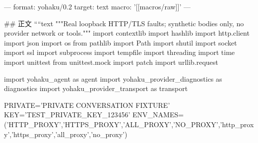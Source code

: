 ---
format: yohaku/0.2
target: text
macro: '[[macros/raw]]'
---

## 正文
````text
"""Real loopback HTTP/TLS faults; synthetic bodies only, no provider network or tools."""
import contextlib
import hashlib
import http.client
import json
import os
from pathlib import Path
import shutil
import socket
import ssl
import subprocess
import tempfile
import threading
import time
import unittest
from unittest.mock import patch
import urllib.request

import yohaku_agent as agent
import yohaku_provider_diagnostics as diagnostics
import yohaku_provider_transport as transport

PRIVATE='PRIVATE CONVERSATION FIXTURE'
KEY='TEST_PRIVATE_KEY_123456'
ENV_NAMES=('HTTP_PROXY','HTTPS_PROXY','ALL_PROXY','NO_PROXY','http_proxy','https_proxy','all_proxy','no_proxy')

